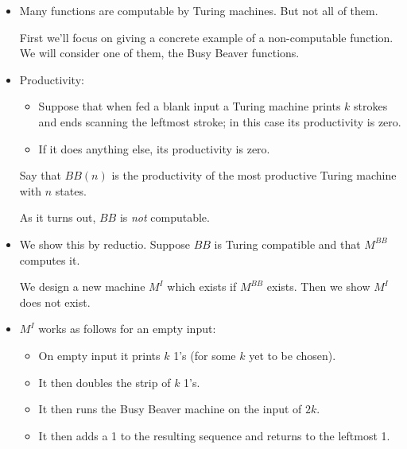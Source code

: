 \documentclass[justified]{tufte-handout}
\begin{document}
\begin{itemize}

\item Many functions are computable by Turing machines. But not all of them.

First we'll focus on giving a concrete example of a non-computable function. We will consider one of them, the Busy Beaver functions.

\item Productivity:

\begin{itemize}

\item Suppose that when fed a blank input a Turing machine prints $k$ strokes and ends scanning the leftmost stroke; in this case its productivity is zero.

\item If it does anything else, its productivity is zero.

\end{itemize}

Say that $BB(n)$ is the productivity of the most productive Turing machine with $n$ states. 


\vspace{.2cm}

\noindent As it turns out, $BB$ is \emph{not} computable.


\item We show this by reductio. Suppose $BB$ is Turing compatible and that $M^{BB}$ computes it.

\vspace{.2cm}

\noindent We design a new machine $M^I$ which exists if $M^{BB}$ exists. Then we show $M^I$ does not exist.


\item $M^I$ works as follows for an empty input: 

\begin{itemize}

\item On empty input it prints $k$ 1's (for some $k$ yet to be chosen).


\item It then doubles the strip of $k$ 1's.

\item It then runs the Busy Beaver machine on the input of $2k$.

\item It then adds a 1 to the resulting sequence and returns to the leftmost 1.


\end{itemize}
\end{itemize}
\end{document}

